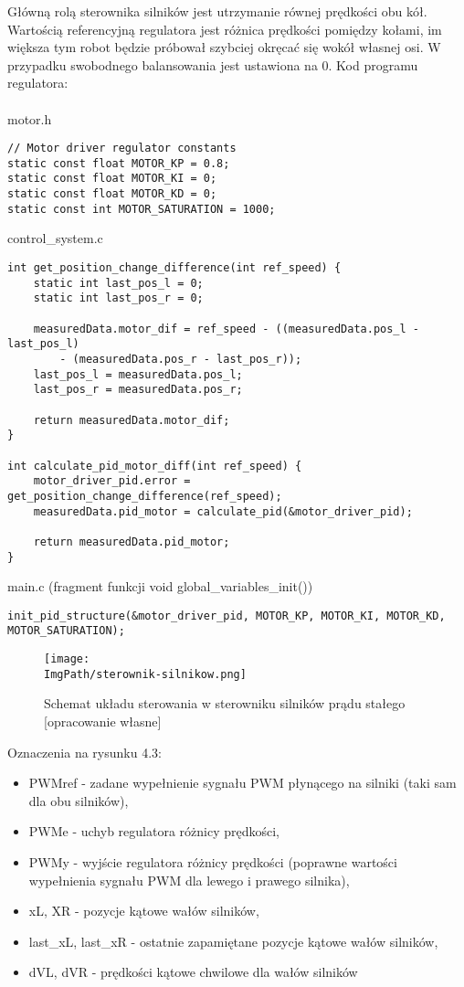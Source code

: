 \documentclass[a4paper,12pt,twoside,openany]{report}
\newcommand{\ImgPath}{.}
\begin{document}
\newpage
Główną rolą sterownika silników jest utrzymanie równej prędkości obu kół. Wartością referencyjną regulatora jest różnica prędkości pomiędzy kołami, im większa tym robot będzie próbował szybciej okręcać się wokół własnej osi. W przypadku swobodnego balansowania jest ustawiona na 0. Kod programu regulatora:\\
\\
\noindent motor.h
\begin{lstlisting}[style=customc]
// Motor driver regulator constants
static const float MOTOR_KP = 0.8;
static const float MOTOR_KI = 0;
static const float MOTOR_KD = 0;
static const int MOTOR_SATURATION = 1000;
\end{lstlisting}
control\_system.c
\begin{lstlisting}[style=customc]
int get_position_change_difference(int ref_speed) {
	static int last_pos_l = 0;
	static int last_pos_r = 0;
	
	measuredData.motor_dif = ref_speed - ((measuredData.pos_l - last_pos_l) 
		- (measuredData.pos_r - last_pos_r));
	last_pos_l = measuredData.pos_l;
	last_pos_r = measuredData.pos_r;
	
	return measuredData.motor_dif;
}

int calculate_pid_motor_diff(int ref_speed) {
	motor_driver_pid.error = get_position_change_difference(ref_speed);
	measuredData.pid_motor = calculate_pid(&motor_driver_pid);
	
	return measuredData.pid_motor;
}
\end{lstlisting}
main.c (fragment funkcji void global\_variables\_init())
\begin{lstlisting}[style=customc]
init_pid_structure(&motor_driver_pid, MOTOR_KP, MOTOR_KI, MOTOR_KD, MOTOR_SATURATION);
\end{lstlisting}

\newpage
\begin{figure}[!htbp]
	\begin{center}
\centering
\texttt{[image: \\ImgPath/sterownik-silnikow.png]}
\end{center}
	\caption{Schemat układu sterowania w sterowniku silników prądu stałego [opracowanie własne]}
	\label{schematKomunikacji}
\end{figure}

\noindent Oznaczenia na rysunku 4.3:
\begin{itemize}
\item PWMref - zadane wypełnienie sygnału PWM płynącego na silniki (taki sam dla obu silników),
\item PWMe - uchyb regulatora różnicy prędkości,
\item PWMy - wyjście regulatora różnicy prędkości (poprawne wartości wypełnienia sygnału PWM dla lewego i prawego silnika),
\item xL, XR - pozycje kątowe wałów silników,
\item last\_xL, last\_xR - ostatnie zapamiętane pozycje kątowe wałów silników,
\item dVL, dVR - prędkości kątowe chwilowe dla wałów silników
\end{itemize}
\end{document}
